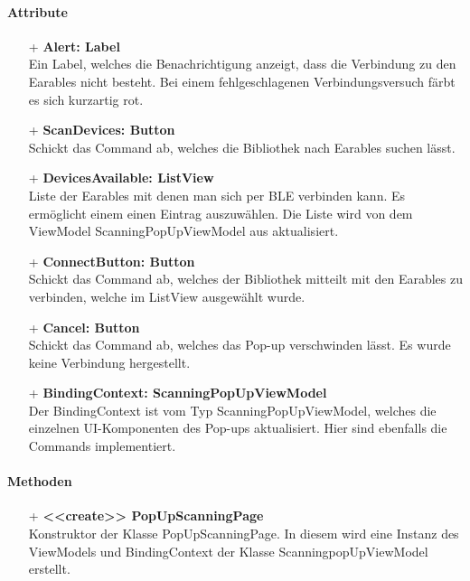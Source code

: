 \documentclass[a4paper,12pt]{article}
\begin{document}
		\paragraph{Attribute}
		\begin{itemize}
		\item[+] \textbf{Alert: Label}\\Ein Label, welches die Benachrichtigung anzeigt, dass die Verbindung zu den \gls{Earables} nicht besteht. Bei einem fehlgeschlagenen Verbindungsversuch färbt es sich kurzartig rot.
		\item[+] \textbf{ScanDevices: Button}\\Schickt das Command ab, welches die Bibliothek nach \gls{Earables} suchen lässt.
		\item[+] \textbf{DevicesAvailable: ListView}\\Liste der \Gls{Earables} mit denen man sich per \gls{BLE} verbinden kann. Es ermöglicht einem einen Eintrag auszuwählen. Die Liste wird von dem ViewModel ScanningPopUpViewModel aus aktualisiert.
		\item[+] \textbf{ConnectButton: Button}\\Schickt das Command ab, welches der Bibliothek mitteilt mit den \Gls{Earables} zu verbinden, welche im ListView ausgewählt wurde.
		\item[+] \textbf{Cancel: Button}\\Schickt das Command ab, welches das Pop-up verschwinden lässt. Es wurde keine Verbindung hergestellt.
		\item[+] \textbf{BindingContext: ScanningPopUpViewModel}\\Der BindingContext ist vom Typ ScanningPopUpViewModel, welches die einzelnen UI-Komponenten des Pop-ups aktualisiert. Hier sind ebenfalls die Commands implementiert.
		\end{itemize}
		
		\paragraph{Methoden}
		\begin{itemize}
		\item[+] \textbf{<<create>> PopUpScanningPage}\\Konstruktor der Klasse PopUpScanningPage. In diesem wird eine Instanz des ViewModels und BindingContext der Klasse ScanningpopUpViewModel erstellt.
		\end{itemize}
\end{document}
